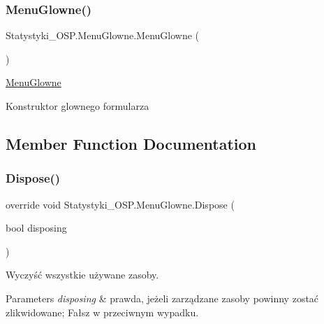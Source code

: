\subsubsection{\texorpdfstring{MenuGlowne()}{MenuGlowne()}}
{\footnotesize\ttfamily Statystyki\+\_\+\+O\+S\+P.\+Menu\+Glowne.\+Menu\+Glowne (\begin{DoxyParamCaption}{ }\end{DoxyParamCaption})}



\mbox{\hyperlink{class_statystyki___o_s_p_1_1_menu_glowne}{Menu\+Glowne}} 

Konstruktor glownego formularza

\subsection{Member Function Documentation}
\mbox{\label{class_statystyki___o_s_p_1_1_menu_glowne_afbebe7500d026a779c7502dde03b641c}} 
\subsubsection{\texorpdfstring{Dispose()}{Dispose()}}
{\footnotesize\ttfamily override void Statystyki\+\_\+\+O\+S\+P.\+Menu\+Glowne.\+Dispose (\begin{DoxyParamCaption}\item[{bool}]{disposing }\end{DoxyParamCaption})\hspace{0.3cm}{\ttfamily [protected]}}



Wyczyść wszystkie używane zasoby. 


\begin{DoxyParams}{Parameters}
{\em disposing} & prawda, jeżeli zarządzane zasoby powinny zostać zlikwidowane; Fałsz w przeciwnym wypadku.\\
\hline
\end{DoxyParams}
\mbox{\label{class_statystyki___o_s_p_1_1_menu_glowne_aca15682a01932d773612d86efd95922f}} 
